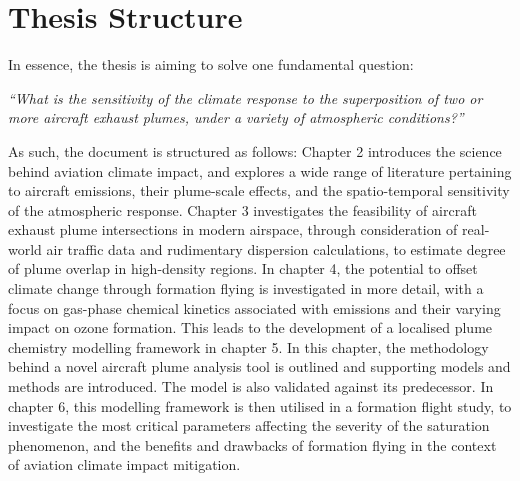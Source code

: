 \section{Thesis Structure}
In essence, the thesis is aiming to solve one fundamental question:

\textit{“What is the sensitivity of the climate response to the superposition of two or more aircraft exhaust plumes, under a variety of atmospheric conditions?”} 

As such, the document is structured as follows: Chapter 2 introduces the science behind aviation climate impact, and explores a wide range of literature pertaining to aircraft emissions, their plume-scale effects, and the spatio-temporal sensitivity of the atmospheric response. Chapter 3 investigates the feasibility of aircraft exhaust plume intersections in modern airspace, through consideration of real-world air traffic data and rudimentary dispersion calculations, to estimate degree of plume overlap in high-density regions. In chapter 4, the potential to offset climate change through formation flying is investigated in more detail, with a focus on gas-phase chemical kinetics associated with  emissions and their varying impact on ozone formation. This leads to the development of a localised plume chemistry modelling framework in chapter 5. In this chapter, the methodology behind a novel aircraft plume analysis tool is outlined and supporting models and methods are introduced. The model is also validated against its predecessor. In chapter 6, this modelling framework is then utilised in a formation flight study, to investigate the most critical parameters affecting the severity of the  saturation phenomenon, and the benefits and drawbacks of formation flying in the context of aviation climate impact mitigation.